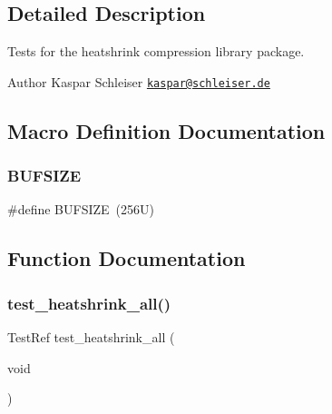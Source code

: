 \subsection{Detailed Description}
Tests for the heatshrink compression library package. 

\begin{DoxyAuthor}{Author}
Kaspar Schleiser \href{mailto:kaspar@schleiser.de}{\tt kaspar@schleiser.\+de} 
\end{DoxyAuthor}


\subsection{Macro Definition Documentation}
\mbox{\label{tests-heatshrink_8c_aeca034f67218340ecb2261a22c2f3dcd}} 
\subsubsection{\texorpdfstring{B\+U\+F\+S\+I\+ZE}{BUFSIZE}}
{\footnotesize\ttfamily \#define B\+U\+F\+S\+I\+ZE~(256\+U)}



\subsection{Function Documentation}
\mbox{\label{tests-heatshrink_8c_ab5b9c302d03ce463b667fdca371b9969}} 
\subsubsection{\texorpdfstring{test\+\_\+heatshrink\+\_\+all()}{test\_heatshrink\_all()}}
{\footnotesize\ttfamily Test\+Ref test\+\_\+heatshrink\+\_\+all (\begin{DoxyParamCaption}\item[{void}]{ }\end{DoxyParamCaption})}

